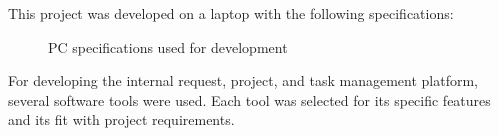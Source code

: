 \vspace{6pt}

\begin{samepage}

{\fontsize{12}{18}\selectfont
\setlength{\parindent}{1.2cm}
\setlength{\parskip}{6pt}

\indent This project was developed on a laptop with the following specifications:

}

\begin{figure}[H]
  \centering
  \caption{PC specifications used for development}
\end{figure}
\end{samepage}


{\fontsize{12}{18}\selectfont
\setlength{\parindent}{1.2cm}
\setlength{\parskip}{6pt}

\indent For developing the internal request, project, and task management platform, several software tools were used. Each tool was selected for its specific features and its fit with project requirements.

}

\newcommand{\toolitemnormal}[4]{%
  \Needspace{12\baselineskip}%
  \begin{samepage}
  \par\vspace{8pt}%
  {\fontsize{12}{18}\selectfont
  \noindent\hspace*{1.2cm}$\bullet$\hspace{0.4em}\textbf{#1 :}\par}%
  \vspace{0.2cm}%
  \noindent\hspace*{1.6cm}%
  \begin{minipage}[t]{0.18\textwidth}
    \vspace{0pt}%
    \centering
    \safeimg[width=#3,height=#3,keepaspectratio]{#2}%
  \end{minipage}%
  \hspace{0.15cm}%
  \begin{minipage}[t]{0.64\textwidth}
    \vspace{0pt}%
    {\fontsize{12}{18}\selectfont\setlength{\parskip}{0pt}\setlength{\emergencystretch}{1em}\justifying #4\par}%
  \end{minipage}%
  \par\vspace{10pt}%
  \end{samepage}%
}

